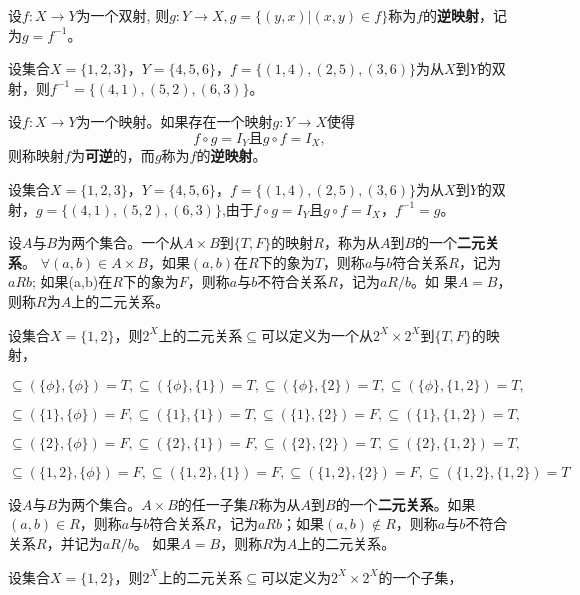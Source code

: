 \documentclass{beamer}
\begin{document}
\begin{CJK*}{UTF8}{gbsn}
\begin{frame}
   \begin{Def}\label{inverse1}
          设$f:X\to Y$为一个双射, 则$g:Y\to X, g=\{(y,x)|(x,y)\in f\}$称为$f$的{\bfseries 逆映射}，记为$g=f^{-1}$。
   \end{Def}
   \begin{Ex}
     设集合$X=\{1,2,3\}$，$Y=\{4,5,6\}$，$f=\{(1,4),(2,5),(3,6)\}$为从$X$到$Y$的双射，则$f^{-1}=\{(4,1),(5,2),(6,3)\}$。
   \end{Ex}
 \end{frame}
 \begin{frame}
       \begin{Def}\label{inverse2}
     设$f:X\to Y$为一个映射。如果存在一个映射$g:Y\to X$使得\[f\circ g = I_{Y} \text{且} g\circ f = I_{X},\]则称映射$f$为{\bfseries 可逆}的，而$g$称为$f$的{\bfseries 逆映射}。
   \end{Def}
      \begin{Ex}
     设集合$X=\{1,2,3\}$，$Y=\{4,5,6\}$，$f=\{(1,4),(2,5),(3,6)\}$为从$X$到$Y$的双射，$g=\{(4,1),(5,2),(6,3)\}$,由于$f\circ g = I_{Y}$且$ g\circ f = I_{X}$，$f^{-1}=g$。
   \end{Ex}
 \end{frame}
 \begin{frame}
   \begin{Def}
    设$A$与$B$为两个集合。一个从$A\times B$到$\{T,F\}$的映射$R$，称为从$A$到$B$的一个{\bfseries 二元关系}。
    $\forall (a,b) \in A \times B$，如果$(a,b)$在$R$下的象为$T$，则称$a$与$b$符合关系$R$，记为$aRb$;
    如果(a,b)在$R$下的象为$F$，则称$a$与$b$不符合关系$R$，记为$aR\!\!\! / b$。如
    果$A=B$，则称$R$为$A$上的二元关系。
  \end{Def}
  \begin{Ex}
  设集合$X=\{1,2\}$，则$2^X$上的二元关系$\subseteq$可以定义为一个从$2^X\times
  2^X$到$\{T,F\}$的映射，

  $\subseteq(\{\phi\},\{\phi\})=T,\subseteq(\{\phi\},\{1\})=T,\subseteq(\{\phi\},\{2\})=T,\subseteq(\{\phi\},\{1,2\})=T,$

    $\subseteq(\{1\},\{\phi\})=F,\subseteq(\{1\},\{1\})=T,\subseteq(\{1\},\{2\})=F,\subseteq(\{1\},\{1,2\})=T,$

      $\subseteq(\{2\},\{\phi\})=F,\subseteq(\{2\},\{1\})=F,\subseteq(\{2\},\{2\})=T,\subseteq(\{2\},\{1,2\})=T,$

        $\subseteq(\{1,2\},\{\phi\})=F,\subseteq(\{1,2\},\{1\})=F,\subseteq(\{1,2\},\{2\})=F,\subseteq(\{1,2\},\{1,2\})=T$
      \end{Ex}
    \end{frame}
    \begin{frame}      
      \begin{Def}
    设$A$与$B$为两个集合。$A\times B$的任一子集$R$称为从$A$到$B$的一个{\bfseries 二元关系}。如果$(a,b)\in R$，则称$a$与$b$符合关系$R$，记为$aRb$；如果$(a,b) \notin R$，则称$a$与$b$不符合关系$R$，并记为$aR\!\!\! / b$。
    如果$A=B$，则称$R$为$A$上的二元关系。
  \end{Def}
    \begin{Ex}
  设集合$X=\{1,2\}$，则$2^X$上的二元关系$\subseteq$可以定义为$2^X\times
  2^X$的一个子集，


\end{Ex}
\end{frame}
\end{CJK*}
\end{document}
